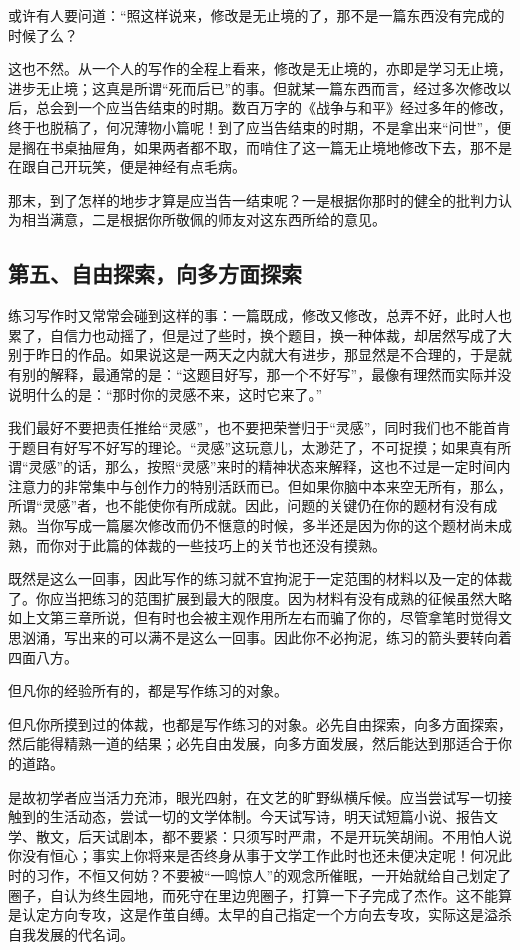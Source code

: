 \documentclass[12pt,a5paper]{ctexbook}
\begin{document}
或许有人要问道：“照这样说来，修改是无止境的了，那不是一篇东西没有完成的时候了么？

这也不然。从一个人的写作的全程上看来，修改是无止境的，亦即是学习无止境，进步无止境；这真是所谓“死而后已”的事。但就某一篇东西而言，经过多次修改以后，总会到一个应当告结束的时期。数百万字的《战争与和平》经过多年的修改，终于也脱稿了，何况薄物小篇呢！到了应当告结束的时期，不是拿出来“问世”，便是搁在书桌抽屉角，如果两者都不取，而啃住了这一篇无止境地修改下去，那不是在跟自己开玩笑，便是神经有点毛病。

那末，到了怎样的地步才算是应当告一结束呢？一是根据你那时的健全的批判力认为相当满意，二是根据你所敬佩的师友对这东西所给的意见。

\subsection{第五、自由探索，向多方面探索}
练习写作时又常常会碰到这样的事：一篇既成，修改又修改，总弄不好，此时人也累了，自信力也动摇了，但是过了些时，换个题目，换一种体裁，却居然写成了大别于昨日的作品。如果说这是一两天之内就大有进步，那显然是不合理的，于是就有别的解释，最通常的是：“这题目好写，那一个不好写”，最像有理然而实际并没说明什么的是：“那时你的灵感不来，这时它来了。”

我们最好不要把责任推给“灵感”，也不要把荣誉归于“灵感”，同时我们也不能首肯于题目有好写不好写的理论。“灵感”这玩意儿，太渺茫了，不可捉摸；如果真有所谓“灵感”的话，那么，按照“灵感”来时的精神状态来解释，这也不过是一定时间内注意力的非常集中与创作力的特别活跃而已。但如果你脑中本来空无所有，那么，所谓“灵感”者，也不能使你有所成就。因此，问题的关键仍在你的题材有没有成熟。当你写成一篇屡次修改而仍不惬意的时候，多半还是因为你的这个题材尚未成熟，而你对于此篇的体裁的一些技巧上的关节也还没有摸熟。

既然是这么一回事，因此写作的练习就不宜拘泥于一定范围的材料以及一定的体裁了。你应当把练习的范围扩展到最大的限度。因为材料有没有成熟的征候虽然大略如上文第三章所说，但有时也会被主观作用所左右而骗了你的，尽管拿笔时觉得文思汹涌，写出来的可以满不是这么一回事。因此你不必拘泥，练习的箭头要转向着四面八方。

但凡你的经验所有的，都是写作练习的对象。

但凡你所摸到过的体裁，也都是写作练习的对象。必先自由探索，向多方面探索，然后能得精熟一道的结果；必先自由发展，向多方面发展，然后能达到那适合于你的道路。

是故初学者应当活力充沛，眼光四射，在文艺的旷野纵横斥候。应当尝试写一切接触到的生活动态，尝试一切的文学体制。今天试写诗，明天试短篇小说、报告文学、散文，后天试剧本，都不要紧：只须写时严肃，不是开玩笑胡闹。不用怕人说你没有恒心；事实上你将来是否终身从事于文学工作此时也还未便决定呢！何况此时的习作，不恒又何妨？不要被“一鸣惊人”的观念所催眠，一开始就给自己划定了圈子，自认为终生园地，而死守在里边兜圈子，打算一下子完成了杰作。这不能算是认定方向专攻，这是作茧自缚。太早的自己指定一个方向去专攻，实际这是溢杀自我发展的代名词。
\end{document}
